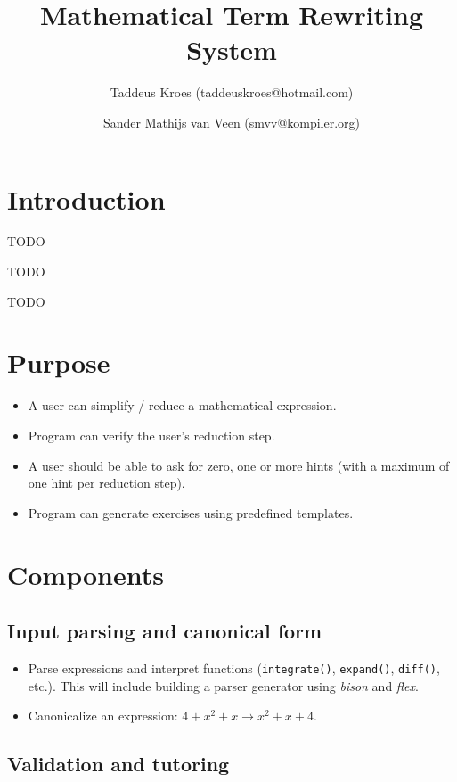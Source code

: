 \documentclass[10pt,a4paper]{article}
\title{Mathematical Term Rewriting System}
\author{Taddeus Kroes (taddeuskroes@hotmail.com)
    \and Sander Mathijs van Veen (smvv@kompiler.org)}
\begin{document}
\maketitle
\tableofcontents

\section{Introduction}

TODO

TODO

TODO

\section{Purpose}

\begin{itemize}
    \item A user can simplify / reduce a mathematical expression.
    \item Program can verify the user's reduction step.
    \item A user should be able to ask for zero, one or more hints (with a
    maximum of one hint per reduction step).
    \item Program can generate exercises using predefined templates.
\end{itemize}

\section{Components}

\subsection{Input parsing and canonical form}

\begin{itemize}
    \item Parse expressions and interpret functions (\texttt{integrate()},
    \texttt{expand()}, \texttt{diff()}, etc.). This will include building a
    parser generator using \emph{bison} and \emph{flex}.
    \item Canonicalize an expression: $4 + x^2 + x \rightarrow x^2 + x + 4$.
\end{itemize}

\subsection{Validation and tutoring}
\end{document}
